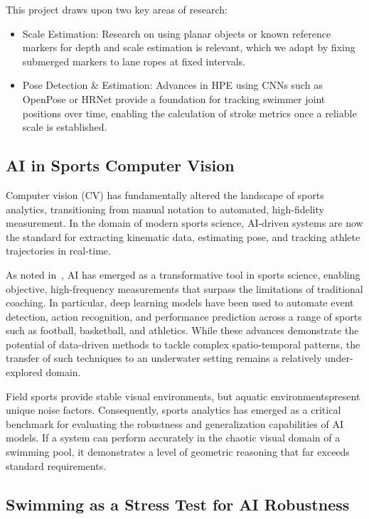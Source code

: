\documentclass[conference]{IEEEtran}
\begin{document}
This project draws upon two key areas of research:
\begin{itemize}
    \item Scale Estimation: Research on using planar objects or known reference markers for depth and scale estimation is relevant, which we adapt by fixing submerged markers to lane ropes at fixed intervals.
    \item Pose Detection \& Estimation: Advances in HPE using CNNs such as OpenPose or HRNet provide a foundation for tracking swimmer joint positions over time, enabling the calculation of stroke metrics once a reliable scale is established.
\end{itemize}


\subsection{AI in Sports Computer Vision}

Computer vision (CV) has fundamentally altered the landscape of sports analytics, transitioning from manual notation to automated, high-fidelity measurement. In the domain of modern sports science, AI-driven systems are now the standard for extracting kinematic data, estimating pose, and tracking athlete trajectories in real-time.

As noted in~\cite{zhou2025}, AI has emerged as a transformative tool in sports science, enabling objective, high-frequency measurements that surpass the limitations of traditional coaching. In particular, deep learning models have been used to automate event detection, action recognition, and performance prediction across a range of sports such as football, basketball, and athletics. While these advances demonstrate the potential of data-driven methods to tackle complex spatio-temporal patterns, the transfer of such techniques to an underwater setting remains a relatively under-explored domain.

Field sports provide stable visual environments, but aquatic environments\newline present unique noise factors. Consequently, sports analytics has emerged as a critical benchmark for evaluating the robustness and generalization capabilities of AI models. If a system can perform accurately in the chaotic visual domain of a swimming pool, it demonstrates a level of geometric reasoning that far exceeds standard requirements.

\subsection{Swimming as a Stress Test for AI Robustness}
\end{document}
